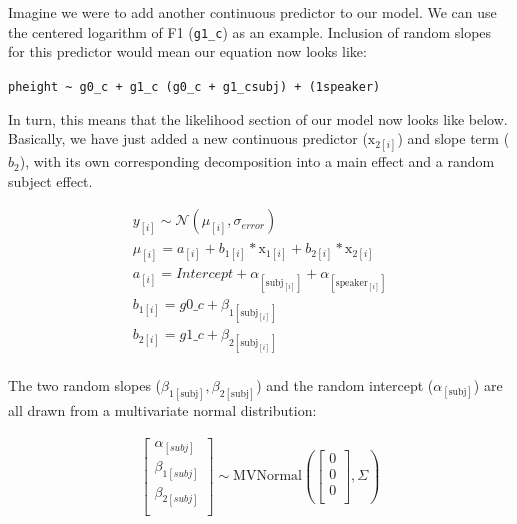 \documentclass[
]{book}
\begin{document}
Imagine we were to add another continuous predictor to our model. We can use the centered logarithm of F1 (\texttt{g1\_c}) as an example. Inclusion of random slopes for this predictor would mean our equation now looks like:

\texttt{pheight\ \textasciitilde{}\ g0\_c\ +\ g1\_c\ (g0\_c\ +\ g1\_c\textbar{}subj)\ +\ (1\textbar{}speaker)}

In turn, this means that the likelihood section of our model now looks like below. Basically, we have just added a new continuous predictor (\(\mathrm{x}_{2[i]}\)) and slope term (\(b_{2}\)), with its own corresponding decomposition into a main effect and a random subject effect.

\begin{equation}
\begin{split}
y_{[i]} \sim \mathcal{N}(\mu_{[i]},\sigma_{error}) \\
\mu_{[i]} = a_{[i]} + b_{1[i]} * \mathrm{x}_{1[i]} + b_{2[i]} * \mathrm{x}_{2[i]}  \\ 
a_{[i]} = Intercept + \alpha_{[\mathrm{subj}_{[i]}]} + \alpha_{[\mathrm{speaker}_{[i]}]}  \\
b_{1[i]} =  g0\_c + \beta_{1{[\mathrm{subj}_{[i]}]}} \\ 
b_{2[i]} =  g1\_c + \beta_{2{[\mathrm{subj}_{[i]}]}} \\ 
\end{split}
\label{eq:613a}
\end{equation}

The two random slopes (\(\beta_{1{[\mathrm{subj}]}},\beta_{2{[\mathrm{subj}]}}\)) and the random intercept (\(\alpha_{[\mathrm{subj}]}\)) are all drawn from a multivariate normal distribution:

\begin{equation}
\begin{split}
\begin{bmatrix} \alpha_{[subj]} \\ \beta_{1[subj]} \\ \beta_{2[subj]} \\ \end{bmatrix}  
\sim \mathrm{MVNormal} ( \begin{bmatrix} 0 \\ 0 \\ 0 \\ \end{bmatrix}, \Sigma) \\ 
\end{split}
\label{eq:613b}
\end{equation}
\end{document}
